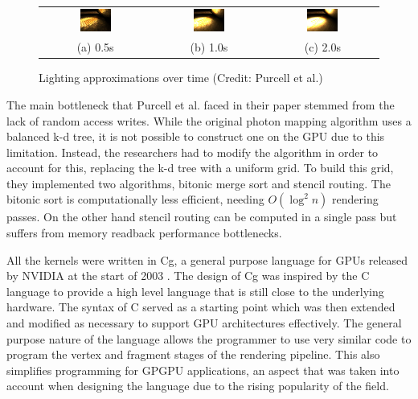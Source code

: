 \begin{figure}[ht] 
    \centering
    \begin{tabular}{ccc}
      \includegraphics[width=0.3\textwidth]{img/half-second-glass-ball.png} & \includegraphics[width=0.3\textwidth]{img/one-second-glass-ball.png} & \includegraphics[width=0.3\textwidth]{img/two-second-glass-ball.png} \\
    (a) 0.5s & (b) 1.0s & (c) 2.0s
    \end{tabular}
    \captionsetup{justification=centering}
    \caption{Lighting approximations over time (Credit: Purcell et al.)}
    \label{fig:lighting-approximations}
\end{figure}

The main bottleneck that Purcell et al. faced in their paper stemmed from the lack of random access writes. While the original photon mapping algorithm uses a balanced k-d tree, it is not possible to construct one on the GPU due to this limitation. Instead, the researchers had to modify the algorithm in order to account for this, replacing the k-d tree with a uniform grid. To build this grid, they implemented two algorithms, bitonic merge sort and stencil routing. The bitonic sort is computationally less efficient, needing \(O(\log^2 n)\) rendering passes. On the other hand stencil routing can be computed in a single pass but suffers from memory readback performance bottlenecks. 

All the kernels were written in Cg, a general purpose language for GPUs released by NVIDIA at the start of 2003 \cite{nvidia_cg}. The design of Cg was inspired by the C language to provide a high level language that is still close to the underlying hardware. The syntax of C served as a starting point which was then extended and modified as necessary to support GPU architectures effectively. The general purpose nature of the language allows the programmer to use very similar code to program the vertex and fragment stages of the rendering pipeline. This also simplifies programming for GPGPU applications, an aspect that was taken into account when designing the language due to the rising popularity of the field.


